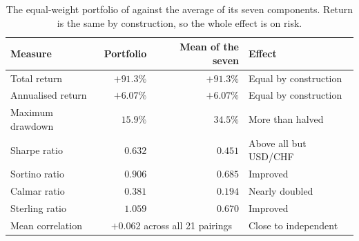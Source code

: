 \begin{table}[htb!]
\centering
\footnotesize
\caption{The equal-weight portfolio of  against the average of its seven components. Return is the same by construction, so the whole effect is on risk.}
\label{Tables:Portfolio}
\begin{tabular}{@{}lrrl@{}}
\toprule
\textbf{Measure} & \textbf{Portfolio} & \textbf{Mean of the seven} & \textbf{Effect} \\
\midrule
Total return & $+91.3\%$ & $+91.3\%$ & Equal by construction \\
Annualised return & $+6.07\%$ & $+6.07\%$ & Equal by construction \\
\addlinespace
Maximum drawdown & $\mathbf{15.9\%}$ & $34.5\%$ & More than halved \\
Sharpe ratio & $\mathbf{0.632}$ & $0.451$ & Above all but USD/CHF \\
Sortino ratio & $0.906$ & $0.685$ & Improved \\
Calmar ratio & $0.381$ & $0.194$ & Nearly doubled \\
Sterling ratio & $1.059$ & $0.670$ & Improved \\
\addlinespace
Mean correlation & \multicolumn{2}{c}{$+0.062$ across all 21 pairings} & Close to independent \\
\bottomrule
\end{tabular}
\end{table}